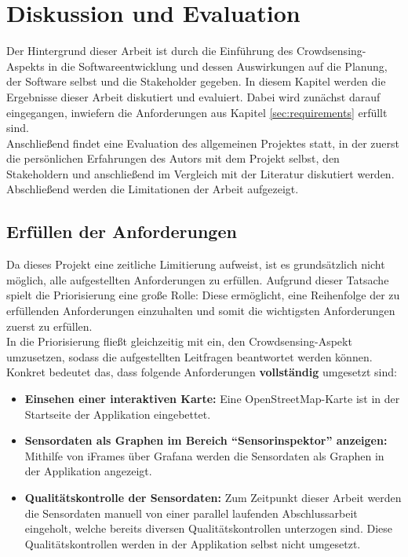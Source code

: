 \chapter{Diskussion und Evaluation}
Der Hintergrund dieser Arbeit ist durch die Einführung des Crowd\-sen\-sing-Aspekts in die Softwareentwicklung und dessen Auswirkungen auf die Planung, der Software selbst und die Stakeholder gegeben. In diesem Kapitel werden die Ergebnisse dieser Arbeit diskutiert und evaluiert. Dabei wird zunächst darauf eingegangen, inwiefern die Anforderungen aus Kapitel \ref{sec:requirements} erfüllt sind. \\ Anschließend findet eine Evaluation des allgemeinen Projektes statt, in der zuerst die persönlichen Erfahrungen des Autors mit dem Projekt selbst, den Stakeholdern und anschließend im Vergleich mit der Literatur diskutiert werden. Abschließend werden die Limitationen der Arbeit aufgezeigt.
\label{sec:discussion}

\section{Erfüllen der Anforderungen}
\label{sec:requirements_evaluation}
Da dieses Projekt eine zeitliche Limitierung aufweist, ist es grundsätzlich nicht möglich, alle aufgestellten Anforderungen zu erfüllen. Aufgrund dieser Tatsache spielt die Priorisierung eine große Rolle: Diese ermöglicht, eine Reihenfolge der zu erfüllenden Anforderungen einzuhalten und somit die wichtigsten Anforderungen zuerst zu erfüllen. \\ In die Priorisierung fließt gleichzeitig mit ein, den Crowdsensing-Aspekt umzusetzen, sodass die aufgestellten Leitfragen beantwortet werden können. Konkret bedeutet das, dass folgende Anforderungen \textbf{vollständig} umgesetzt sind:

\begin{itemize}
    \item \textbf{Einsehen einer interaktiven Karte:} Eine OpenStreetMap-Karte ist in der Startseite der Applikation eingebettet.
    \item \textbf{Sensordaten als Graphen im Bereich \enquote{Sensorinspektor} anzeigen:} Mithilfe von iFrames über Grafana werden die Sensordaten als Graphen in der Applikation angezeigt.
    \item \textbf{Qualitätskontrolle der Sensordaten:} Zum Zeitpunkt dieser Arbeit werden die Sensordaten manuell von einer parallel laufenden Abschlussarbeit eingeholt, welche bereits diversen Qualitätskontrollen unterzogen sind. Diese Qualitätskontrollen werden in der Applikation selbst nicht umgesetzt.
\end{itemize}

